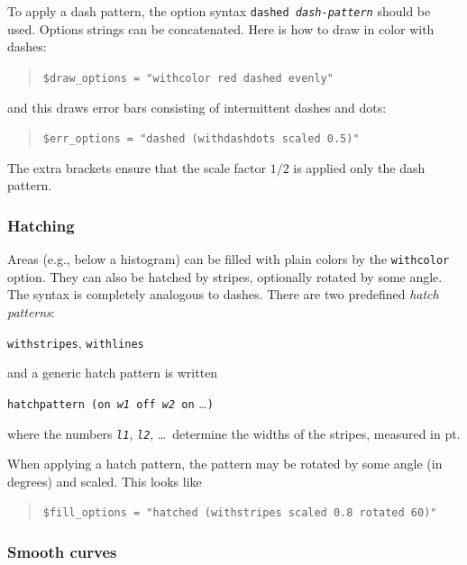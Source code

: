 \documentclass[12pt]{book}
\newcommand{\ttt}[1]{\texttt{#1}}
\begin{document}
To apply a dash pattern, the option syntax \ttt{dashed \emph{dash-pattern}}
should be used.  Options strings can be concatenated.  Here is how to draw in
color with dashes:
\begin{quote}
  \begin{footnotesize}
    \ttt{\$draw\_options = "withcolor red dashed evenly"}
  \end{footnotesize}
\end{quote}
and this draws error bars consisting of intermittent dashes and
dots:
\begin{quote}
  \begin{footnotesize}
    \ttt{\$err\_options = "dashed (withdashdots scaled 0.5)"}
  \end{footnotesize}
\end{quote}
The extra brackets ensure that the scale factor $1/2$ is applied only the dash
pattern.


\subsubsection{Hatching}

Areas (e.g., below a histogram) can be filled with plain colors by the
\ttt{withcolor} option.  They can also be hatched by stripes, optionally
rotated by some angle.  The syntax is completely analogous to dashes.  There
are two predefined \emph{hatch patterns}:
\begin{center}
   \ttt{withstripes}, \ttt{withlines}
\end{center}
and a generic hatch pattern is written
\begin{center}
  \ttt{hatchpattern (on \emph{w1} off \emph{w2} on} \ldots \ttt{)}
\end{center}
where the numbers \ttt{\emph{l1}}, \ttt{\emph{l2}}, \ldots\ determine the
widths of the stripes, measured in pt.

When applying a hatch pattern, the pattern may be rotated by some angle (in
degrees) and scaled.  This looks like
\begin{quote}
  \begin{footnotesize}
    \ttt{\$fill\_options = "hatched (withstripes scaled 0.8 rotated 60)"}
  \end{footnotesize}
\end{quote}


\subsubsection{Smooth curves}
\end{document}
